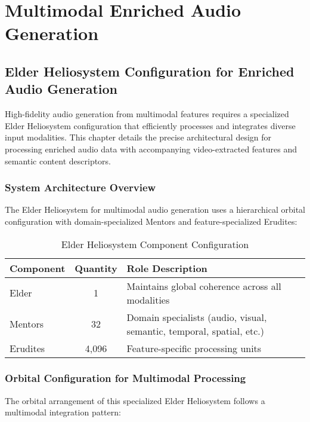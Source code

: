 \chapter{Multimodal Enriched Audio Generation}

\section{Elder Heliosystem Configuration for Enriched Audio Generation}

High-fidelity audio generation from multimodal features requires a specialized Elder Heliosystem configuration that efficiently processes and integrates diverse input modalities. This chapter details the precise architectural design for processing enriched audio data with accompanying video-extracted features and semantic content descriptors.

\subsection{System Architecture Overview}

The Elder Heliosystem for multimodal audio generation uses a hierarchical orbital configuration with domain-specialized Mentors and feature-specialized Erudites:

\begin{table}[h]
\centering
\begin{tabular}{|l|c|l|}
\hline
\textbf{Component} & \textbf{Quantity} & \textbf{Role Description} \\
\hline
Elder & 1 & Maintains global coherence across all modalities \\
\hline
Mentors & 32 & Domain specialists (audio, visual, semantic, temporal, spatial, etc.) \\
\hline
Erudites & 4,096 & Feature-specific processing units \\
\hline
\end{tabular}
\caption{Elder Heliosystem Component Configuration}
\end{table}

\subsection{Orbital Configuration for Multimodal Processing}

The orbital arrangement of this specialized Elder Heliosystem follows a multimodal integration pattern:

